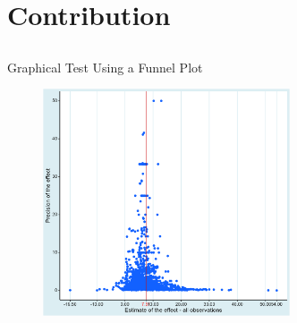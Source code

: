 \documentclass{beamer} %
\begin{document}
\section{Contribution}
\subsection{}





\begin{frame}{Graphical Test Using a Funnel Plot}
    \begin{figure}[htbp]
        \begin{center}
            \includegraphics[width=0.65\textwidth]{Figures/funnel.png}
        \end{center}
    \end{figure}
\end{frame}
\end{document}
